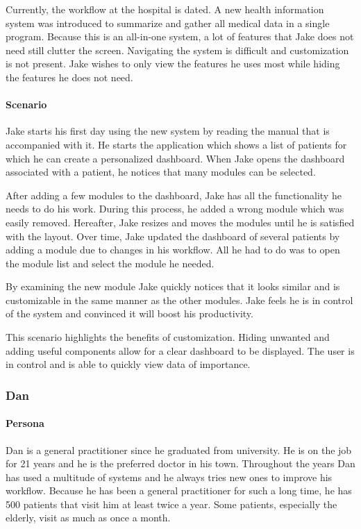         Currently, the workflow at the hospital is dated. A new health information system was introduced to summarize and gather all medical data in a single program. Because this is an all-in-one system, a lot of features that Jake does not need still clutter the screen. Navigating the system is difficult and customization is not present. Jake wishes to only view the features he uses most while hiding the features he does not need.
        
        \paragraph{Scenario} Jake starts his first day using the new system by reading the manual that is accompanied with it. He starts the application which shows a list of patients for which he can create a personalized dashboard. When Jake opens the dashboard associated with a patient, he notices that many modules can be selected.

        After adding a few modules to the dashboard, Jake has all the functionality he needs to do his work. During this process, he added a wrong module which was easily removed. Hereafter, Jake resizes and moves the modules until he is satisfied with the layout. Over time, Jake updated the dashboard of several patients by adding a module due to changes in his workflow. All he had to do was to open the module list and select the module he needed.

        By examining the new module Jake quickly notices that it looks similar and is customizable in the same manner as the other modules. Jake feels he is in control of the system and convinced it will boost his productivity.\bigskip
        
        \noindent This scenario highlights the benefits of customization. Hiding unwanted and adding useful components allow for a clear dashboard to be displayed. The user is in control and is able to quickly view data of importance.
        
        \subsubsection{Dan}

        \paragraph{Persona} Dan is a general practitioner since he graduated from university. He is on the job for 21 years and he is the preferred doctor in his town. Throughout the years Dan has used a multitude of systems and he always tries new ones to improve his workflow. Because he has been a general practitioner for such a long time, he has 500 patients that visit him at least twice a year. Some patients, especially the elderly, visit as much as once a month.

